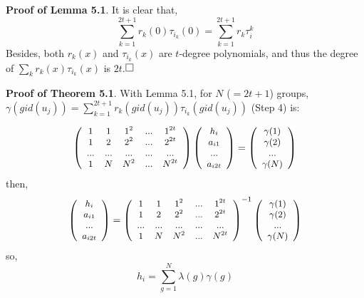 \documentclass[11pt]{article}
\begin{document}
\textbf{Proof of Lemma 5.1}. It is clear that,
\begin{equation}
	\sum_{k=1}^{2t+1} r_k(0)\tau_{i_k}(0) = \sum_{k=1}^{2t+1} r_k\tau_i^k
\end{equation}
Besides, both $r_k(x)$ and $\tau_{i_k}(x)$ are $t$-degree polynomials, and thus the degree of $\sum_k r_k(x)\tau_{i_k}(x)$ is $2t$.$\qed$

\vspace{+.5em}

\noindent \textbf{Proof of Theorem 5.1}. With Lemma 5.1, for $N$ ($=2t+1$) groups, $\gamma(gid(u_j))
=\sum_{k=1}^{2t+1} r_k(gid(u_j)) \tau_{i_k}(gid(u_j))$ (Step 4) is:

\[
\small
\left(\begin{array}{ccccc}
	1 &    1 & 1^2 & ...  & 1^{2t} \\
	1 &    2 & 2^2 & ... & 2^{2t}\\
	... & ... & ... & ...& ...\\
	1 & N & N^2 & ... & N^{2t}\\
\end{array}\right)
\left(\begin{array}{c}
	h_i    \\
	a_{i1}    \\
	... \\
	a_{i2t} \\
\end{array}\right)
=
\left(\begin{array}{c}
	\gamma(1)    \\
	\gamma(2)    \\
	... \\
	\gamma(N) \\
\end{array}\right)
\]
then,
\[
\small
\left(\begin{array}{c}
	h_i    \\
	a_{i1}    \\
	... \\
	a_{i2t} \\
\end{array}\right)
=
\left(\begin{array}{ccccc}
	1 &    1 & 1^2 & ...  & 1^{2t} \\
	1 &    2 & 2^2 & ... & 2^{2t}\\
	... & ... & ... & ...& ...\\
	1 & N & N^2 & ... & N^{2t}\\
\end{array}\right)^{-1}
\left(\begin{array}{c}
	\gamma(1)    \\
	\gamma(2)    \\
	... \\
	\gamma(N) \\
\end{array}\right)
\]
so,
$$h_i=\sum_{g=1}^{N} \lambda(g)\gamma(g)$$
\end{document}
